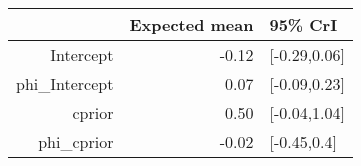\begin{tabular}{rrl}
  \hline
 & Expected mean & 95\% CrI \\ 
  \hline
Intercept & -0.12 & [-0.29,0.06] \\ 
  phi\_Intercept & 0.07 & [-0.09,0.23] \\ 
  cprior & 0.50 & [-0.04,1.04] \\ 
  phi\_cprior & -0.02 & [-0.45,0.4] \\ 
   \hline
\end{tabular}

